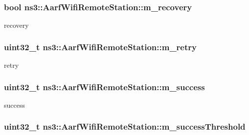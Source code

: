 \subsubsection[{\texorpdfstring{m\+\_\+recovery}{m_recovery}}]{\setlength{\rightskip}{0pt plus 5cm}bool ns3\+::\+Aarf\+Wifi\+Remote\+Station\+::m\+\_\+recovery}\hypertarget{structns3_1_1AarfWifiRemoteStation_a0e32429b6e0ef2f93940f8d3113b0cf0}{}\label{structns3_1_1AarfWifiRemoteStation_a0e32429b6e0ef2f93940f8d3113b0cf0}


recovery 

\subsubsection[{\texorpdfstring{m\+\_\+retry}{m_retry}}]{\setlength{\rightskip}{0pt plus 5cm}uint32\+\_\+t ns3\+::\+Aarf\+Wifi\+Remote\+Station\+::m\+\_\+retry}\hypertarget{structns3_1_1AarfWifiRemoteStation_aced8fb87c251a20d4d3a3ab5e5fc2f8e}{}\label{structns3_1_1AarfWifiRemoteStation_aced8fb87c251a20d4d3a3ab5e5fc2f8e}


retry 

\subsubsection[{\texorpdfstring{m\+\_\+success}{m_success}}]{\setlength{\rightskip}{0pt plus 5cm}uint32\+\_\+t ns3\+::\+Aarf\+Wifi\+Remote\+Station\+::m\+\_\+success}\hypertarget{structns3_1_1AarfWifiRemoteStation_a0cfd902eb4ef3948e1983a5eb8c98530}{}\label{structns3_1_1AarfWifiRemoteStation_a0cfd902eb4ef3948e1983a5eb8c98530}


success 

\subsubsection[{\texorpdfstring{m\+\_\+success\+Threshold}{m_successThreshold}}]{\setlength{\rightskip}{0pt plus 5cm}uint32\+\_\+t ns3\+::\+Aarf\+Wifi\+Remote\+Station\+::m\+\_\+success\+Threshold}\hypertarget{structns3_1_1AarfWifiRemoteStation_ac215e2c0223a8e1eae00ed67a9833519}{}\label{structns3_1_1AarfWifiRemoteStation_ac215e2c0223a8e1eae00ed67a9833519}



